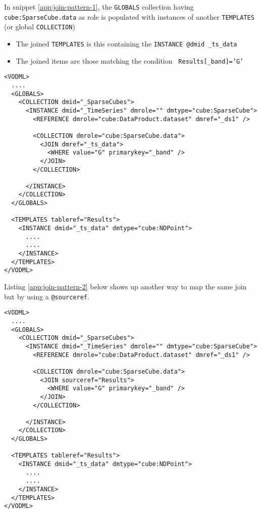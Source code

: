 
In snippet \ref{app:join-pattern-1}, the \texttt{GLOBALS} collection having \texttt{cube:SparseCube.data} as role is populated with  instances of another \texttt{TEMPLATES} (or global \texttt{COLLECTION})
\begin{itemize}
  \item The joined \texttt{TEMPLATES} is this containing the  \texttt{INSTANCE \texttt{@dmid} \_ts\_data}
  \item The joined items are those matching the condition  \texttt{ Results[\_band]='G'}
\end{itemize}

\begin{lstlisting}[frame=single,label={app:join-pattern-1},caption={Joining a global \texttt{COLLECTION} with a \texttt{TEMPLATES}  identified by a \texttt{@dmid} \texttt{@dmref} pair},style=XML,basicstyle=\tiny]
<VODML>
  ....
  <GLOBALS>
    <COLLECTION dmid="_SparseCubes">
      <INSTANCE dmid="_TimeSeries" dmrole="" dmtype="cube:SparseCube">
        <REFERENCE dmrole="cube:DataProduct.dataset" dmref="_ds1" />
        
        <COLLECTION dmrole="cube:SparseCube.data">
          <JOIN dmref="_ts_data">
            <WHERE value="G" primarykey="_band" />
          </JOIN>
        </COLLECTION>
        
      </INSTANCE>
    </COLLECTION>
  </GLOBALS>

  <TEMPLATES tableref="Results">
    <INSTANCE dmid="_ts_data" dmtype="cube:NDPoint">
      ....
      ....
    </INSTANCE>
  </TEMPLATES>
</VODML>
\end{lstlisting}  

Listing \ref{app:join-pattern-2} below shows up another way to map the same join but by using a \texttt{@sourceref}.

\begin{lstlisting}[frame=single,label={app:join-pattern-2},caption={Joining a global \texttt{COLLECTION} with a \texttt{TEMPLATES}  identified by a @sourceref},style=XML,basicstyle=\tiny]
<VODML>
  ....
  <GLOBALS>
    <COLLECTION dmid="_SparseCubes">
      <INSTANCE dmid="_TimeSeries" dmrole="" dmtype="cube:SparseCube">
        <REFERENCE dmrole="cube:DataProduct.dataset" dmref="_ds1" />
        
        <COLLECTION dmrole="cube:SparseCube.data">
          <JOIN sourceref="Results">
            <WHERE value="G" primarykey="_band" />
          </JOIN>
        </COLLECTION>
        
      </INSTANCE>
    </COLLECTION>
  </GLOBALS>

  <TEMPLATES tableref="Results">
    <INSTANCE dmid="_ts_data" dmtype="cube:NDPoint">
      ....
      ....
    </INSTANCE>
  </TEMPLATES>
</VODML>
\end{lstlisting}  

